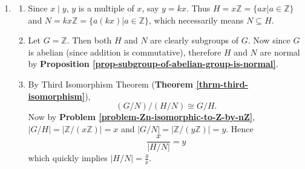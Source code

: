 \begin{enumerate}
    \item \begin{enumerate}[label=(\roman*)]
        \item Since $x\;|\;y$, $y$ is a multiple of $x$, say $y = kx$. Thus $H = x\mathbb{Z} = \{ax \vert a \in \mathbb{Z}\}$ and $N = kx\mathbb{Z} = \{a(kx) \vert a \in \mathbb{Z}\}$, which necessarily means $N \subseteq H$.
        \item Let $G = \mathbb{Z}$. Then both $H$ and $N$ are clearly subgroups of $G$. Now since $G$ is abelian (since addition is commutative), therefore $H$ and $N$ are normal by \textbf{Proposition \ref{prop-subgroup-of-abelian-group-is-normal}}.
        \item By Third Isomorphism Theorem (\textbf{Theorem \ref{thrm-third-isomorphism}}),
        \[
            (G/N)/(H/N) \cong G/H.
        \]
        Now by \textbf{Problem \ref{problem-Zn-isomorphic-to-Z-by-nZ}}, $|G/H| = |\mathbb{Z}/(x\mathbb{Z})| = x$ and $|G/N| = |\mathbb{Z}/(y\mathbb{Z})| = y$. Hence
        \[
            \frac{x}{|H/N|} = y
        \]
        which quickly implies $|H/N| = \frac yx$.
    \end{enumerate}
\end{enumerate}


